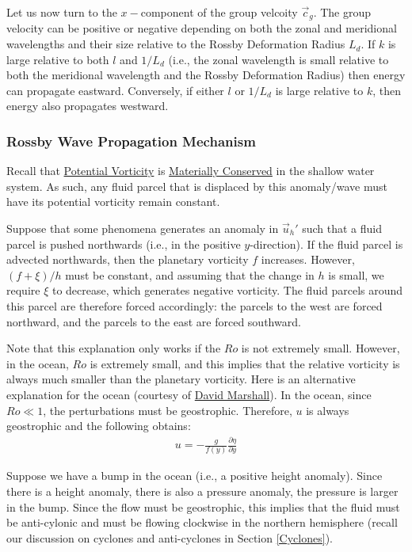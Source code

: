 Let us now turn to the $x-$component of the group velcoity $\vec{c}_g$. The group velocity can be positive or negative depending on both the zonal and meridional wavelengths and their size relative to the Rossby Deformation Radius $L_d$. If $k$ is large relative to both $l$ and $1/L_d$ (i.e., the zonal wavelength is small relative to both the meridional wavelength and the Rossby Deformation Radius) then energy can propagate eastward. Conversely, if either $l$ or $1/L_d$ is large relative to $k$, then energy also propagates westward.

\subsubsection{Rossby Wave Propagation Mechanism}

Recall that \hyperref[PV]{Potential Vorticity} is \hyperref[Cons PV Box]{Materially Conserved} in the shallow water system. As such, any fluid parcel that is displaced by this anomaly/wave must have its potential vorticity remain constant.

Suppose that some phenomena generates an anomaly in $\vec{u}_h'$ such that a fluid parcel is pushed northwards (i.e., in the positive $y$-direction). If the fluid parcel is advected northwards, then the planetary vorticity $f$ increases. However, $(f+\xi)/h$ must be constant, and assuming that the change in $h$ is small, we require $\xi$ to decrease, which generates negative vorticity. The fluid parcels around this parcel are therefore forced accordingly: the parcels to the west are forced northward, and the parcels to the east are forced southward.

Note that this explanation only works if the $Ro$ is not extremely small. However, in the ocean, $Ro$ is extremely small, and this implies that the relative vorticity is always much smaller than the planetary vorticity. Here is an alternative explanation for the ocean (courtesy of \href{https://www.physics.ox.ac.uk/our-people/marshalld}{David Marshall}). In the ocean, since $Ro\ll 1$, the perturbations must be geostrophic. Therefore, $u$ is always geostrophic and the following obtains:
\begin{align*}
    u = - \frac{g}{f(y)}\frac{\partial \eta}{\partial y}
\end{align*}

Suppose we have a bump in the ocean (i.e., a positive height anomaly). Since there is a height anomaly, there is also a pressure anomaly, the pressure is larger in the bump. Since the flow must be geostrophic, this implies that the fluid must be anti-cylonic and must be flowing clockwise in the northern hemisphere (recall our discussion on cyclones and anti-cyclones in Section \ref{Cyclones}).

